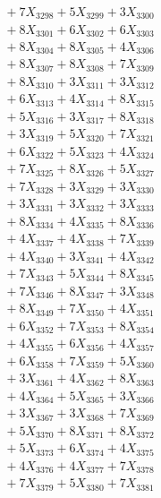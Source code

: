 \documentclass[a4paper,10pt]{article}
\begin{document}
{\begin{align}
&\;  + 7 X_{3298} + 5 X_{3299} + 3 X_{3300} \\[0.3ex]
&\;  + 8 X_{3301} + 6 X_{3302} + 6 X_{3303} \\[0.3ex]
&\;  + 8 X_{3304} + 8 X_{3305} + 4 X_{3306} \\[0.3ex]
&\;  + 8 X_{3307} + 8 X_{3308} + 7 X_{3309} \\[0.5ex]\allowbreak
&\;  + 8 X_{3310} + 3 X_{3311} + 3 X_{3312} \\[0.3ex]
&\;  + 6 X_{3313} + 4 X_{3314} + 8 X_{3315} \\[0.3ex]
&\;  + 5 X_{3316} + 3 X_{3317} + 8 X_{3318} \\[0.3ex]
&\;  + 3 X_{3319} + 5 X_{3320} + 7 X_{3321} \\[0.3ex]
&\;  + 6 X_{3322} + 5 X_{3323} + 4 X_{3324} \\[0.3ex]
&\;  + 7 X_{3325} + 8 X_{3326} + 5 X_{3327} \\[0.3ex]
&\;  + 7 X_{3328} + 3 X_{3329} + 3 X_{3330} \\[0.3ex]
&\;  + 3 X_{3331} + 3 X_{3332} + 3 X_{3333} \\[0.3ex]
&\;  + 8 X_{3334} + 4 X_{3335} + 8 X_{3336} \\[0.3ex]
&\;  + 4 X_{3337} + 4 X_{3338} + 7 X_{3339} \\[0.5ex]\allowbreak
&\;  + 4 X_{3340} + 3 X_{3341} + 4 X_{3342} \\[0.3ex]
&\;  + 7 X_{3343} + 5 X_{3344} + 8 X_{3345} \\[0.3ex]
&\;  + 7 X_{3346} + 8 X_{3347} + 3 X_{3348} \\[0.3ex]
&\;  + 8 X_{3349} + 7 X_{3350} + 4 X_{3351} \\[0.3ex]
&\;  + 6 X_{3352} + 7 X_{3353} + 8 X_{3354} \\[0.3ex]
&\;  + 4 X_{3355} + 6 X_{3356} + 4 X_{3357} \\[0.3ex]
&\;  + 6 X_{3358} + 7 X_{3359} + 5 X_{3360} \\[0.3ex]
&\;  + 3 X_{3361} + 4 X_{3362} + 8 X_{3363} \\[0.3ex]
&\;  + 4 X_{3364} + 5 X_{3365} + 3 X_{3366} \\[0.3ex]
&\;  + 3 X_{3367} + 3 X_{3368} + 7 X_{3369} \\[0.5ex]\allowbreak
&\;  + 5 X_{3370} + 8 X_{3371} + 8 X_{3372} \\[0.3ex]
&\;  + 5 X_{3373} + 6 X_{3374} + 4 X_{3375} \\[0.3ex]
&\;  + 4 X_{3376} + 4 X_{3377} + 7 X_{3378} \\[0.3ex]
&\;  + 7 X_{3379} + 5 X_{3380} + 7 X_{3381} \\[0.3ex]

\end{align}}
\end{document}
